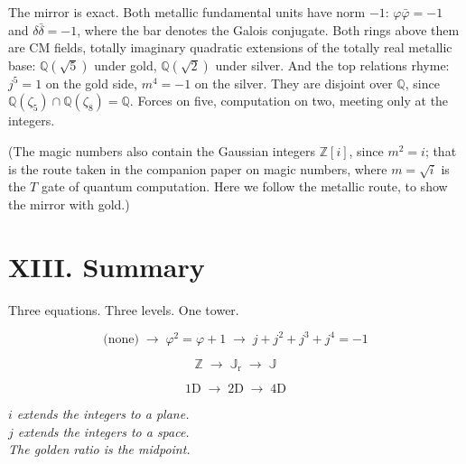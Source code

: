 \documentclass[11pt, a4paper]{article}
\newcommand{\ph}{\varphi}
\newcommand{\TT}{\mathbb{J}}
\newcommand{\TTr}{\mathbb{J}_{\mathrm{r}}}
\begin{document}
The mirror is exact. Both metallic fundamental units have norm $-1$: $\ph\bar\ph = -1$ and $\delta\bar\delta = -1$, where the bar denotes the Galois conjugate. Both rings above them are CM fields, totally imaginary quadratic extensions of the totally real metallic base: $\mathbb{Q}(\sqrt{5})$ under gold, $\mathbb{Q}(\sqrt{2})$ under silver. And the top relations rhyme: $j^5 = 1$ on the gold side, $m^4 = -1$ on the silver. They are disjoint over $\mathbb{Q}$, since $\mathbb{Q}(\zeta_5) \cap \mathbb{Q}(\zeta_8) = \mathbb{Q}$. Forces on five, computation on two, meeting only at the integers.

(The magic numbers also contain the Gaussian integers $\mathbb{Z}[i]$, since $m^2 = i$; that is the route taken in the companion paper on magic numbers, where $m = \sqrt{i}$ is the $T$ gate of quantum computation. Here we follow the metallic route, to show the mirror with gold.)

\newpage
\section*{XIII. Summary}

Three equations. Three levels. One tower.

\begin{equation*}
\text{(none)} \;\longrightarrow\; \ph^2 = \ph + 1 \;\longrightarrow\; j + j^2 + j^3 + j^4 = -1
\end{equation*}

\begin{equation*}
\mathbb{Z} \;\longrightarrow\; \TTr \;\longrightarrow\; \TT
\end{equation*}

\begin{equation*}
1\text{D} \;\longrightarrow\; 2\text{D} \;\longrightarrow\; 4\text{D}
\end{equation*}

\vspace{0.5em}

\begin{center}
\textit{$i$ extends the integers to a plane.}\\[0.3em]
\textit{$j$ extends the integers to a space.}\\[0.3em]
\textit{The golden ratio is the midpoint.}
\end{center}

\vspace{1.5em}
\end{document}
